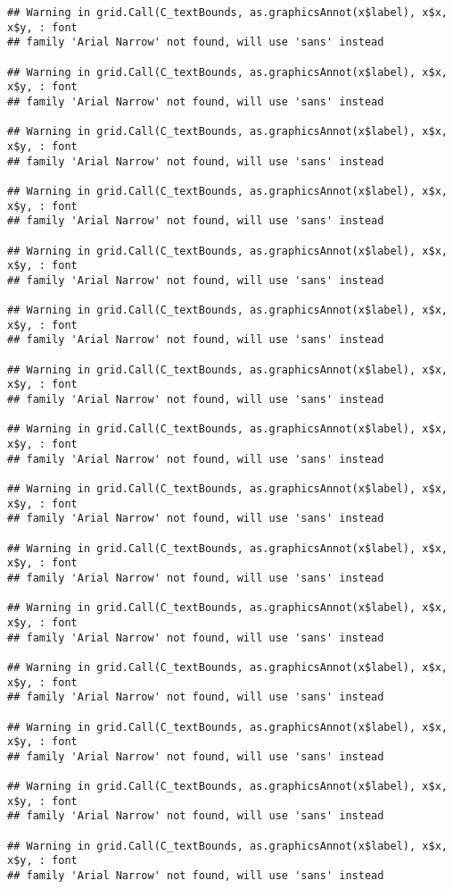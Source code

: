 \documentclass[
]{article}
\begin{document}
\begin{verbatim}
## Warning in grid.Call(C_textBounds, as.graphicsAnnot(x$label), x$x, x$y, : font
## family 'Arial Narrow' not found, will use 'sans' instead

## Warning in grid.Call(C_textBounds, as.graphicsAnnot(x$label), x$x, x$y, : font
## family 'Arial Narrow' not found, will use 'sans' instead

## Warning in grid.Call(C_textBounds, as.graphicsAnnot(x$label), x$x, x$y, : font
## family 'Arial Narrow' not found, will use 'sans' instead

## Warning in grid.Call(C_textBounds, as.graphicsAnnot(x$label), x$x, x$y, : font
## family 'Arial Narrow' not found, will use 'sans' instead

## Warning in grid.Call(C_textBounds, as.graphicsAnnot(x$label), x$x, x$y, : font
## family 'Arial Narrow' not found, will use 'sans' instead

## Warning in grid.Call(C_textBounds, as.graphicsAnnot(x$label), x$x, x$y, : font
## family 'Arial Narrow' not found, will use 'sans' instead

## Warning in grid.Call(C_textBounds, as.graphicsAnnot(x$label), x$x, x$y, : font
## family 'Arial Narrow' not found, will use 'sans' instead

## Warning in grid.Call(C_textBounds, as.graphicsAnnot(x$label), x$x, x$y, : font
## family 'Arial Narrow' not found, will use 'sans' instead

## Warning in grid.Call(C_textBounds, as.graphicsAnnot(x$label), x$x, x$y, : font
## family 'Arial Narrow' not found, will use 'sans' instead

## Warning in grid.Call(C_textBounds, as.graphicsAnnot(x$label), x$x, x$y, : font
## family 'Arial Narrow' not found, will use 'sans' instead

## Warning in grid.Call(C_textBounds, as.graphicsAnnot(x$label), x$x, x$y, : font
## family 'Arial Narrow' not found, will use 'sans' instead

## Warning in grid.Call(C_textBounds, as.graphicsAnnot(x$label), x$x, x$y, : font
## family 'Arial Narrow' not found, will use 'sans' instead

## Warning in grid.Call(C_textBounds, as.graphicsAnnot(x$label), x$x, x$y, : font
## family 'Arial Narrow' not found, will use 'sans' instead

## Warning in grid.Call(C_textBounds, as.graphicsAnnot(x$label), x$x, x$y, : font
## family 'Arial Narrow' not found, will use 'sans' instead

## Warning in grid.Call(C_textBounds, as.graphicsAnnot(x$label), x$x, x$y, : font
## family 'Arial Narrow' not found, will use 'sans' instead


\end{verbatim}
\end{document}
